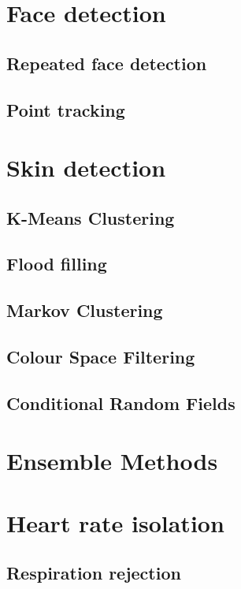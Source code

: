 \section{Face detection}
\subsection{Repeated face detection}
\subsection{Point tracking}

\section{Skin detection}
\subsection{K-Means Clustering}
\subsection{Flood filling}
\subsection{Markov Clustering}

\subsection{Colour Space Filtering}
\subsubsection{}

\subsection{Conditional Random Fields}

\section{Ensemble Methods}

\section{Heart rate isolation}
\subsection{Respiration rejection}